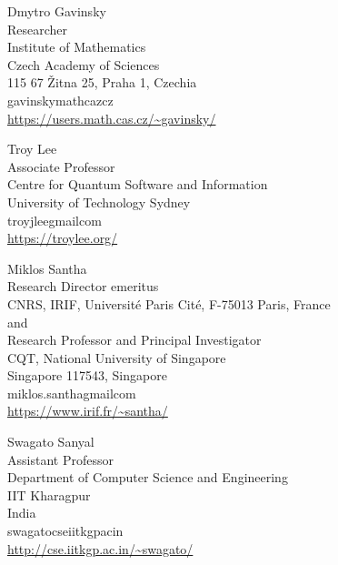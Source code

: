 \documentclass{toc}
\begin{document}
%
%
%
%


%
%
%
%
%
\begin{tocauthors}
\begin{tocinfo}[Gavinsky]  %
  Dmytro Gavinsky\\
  Researcher \\
  Institute of Mathematics\\
  Czech Academy of Sciences\\
  115 67 \v Zitna 25, Praha 1, Czechia \\
  gavinsky\tocat{}math\tocdot{}caz\tocdot{}cz \\
  \url{https://users.math.cas.cz/~gavinsky/}
\end{tocinfo}
\begin{tocinfo}[Lee]
  Troy Lee\\
  Associate Professor \\
  Centre for Quantum Software and Information\\
  University of Technology Sydney \\
  troyjlee\tocat{}gmail\tocdot{}com \\
  \url{https://troylee.org/}
\end{tocinfo}
\begin{tocinfo}[Santha]
  Miklos Santha\\
  Research Director emeritus \\
  CNRS, IRIF, Universit{\'e} Paris Cit{\'e}, F-75013 Paris, France \\
  and \\
  Research Professor and Principal Investigator \\
%
  CQT, National University of Singapore\\   %
  Singapore 117543, Singapore \\            %
  miklos.santha\tocat{}gmail\tocdot{}com\\
  \url{https://www.irif.fr/~santha/}
\end{tocinfo}
\begin{tocinfo}[Sanyal]
 Swagato Sanyal\\
 Assistant Professor\\
 Department of Computer Science and Engineering\\
 IIT Kharagpur\\
 India\\
 swagato\tocat{}cse\tocdot{}iitkgp\tocdot{}ac\tocdot{}in \\%
 \url{http://cse.iitkgp.ac.in/~swagato/}      %
\end{tocinfo}
\end{tocauthors}
\end{document}
